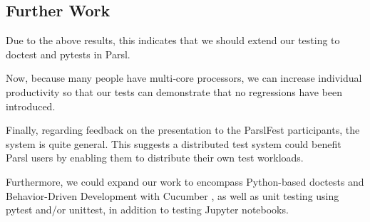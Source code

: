 
\subsection{Further Work}

Due to the above results, this indicates that we should extend our testing to doctest and pytests in Parsl.

Now, because many people have multi‑core processors, we can increase individual productivity so that our tests can demonstrate that no regressions have been introduced.

Finally, regarding feedback on the presentation to the ParslFest participants, the system is quite general. This suggests a distributed test system could benefit Parsl users by enabling them to distribute their own test workloads.

Furthermore, we could expand our work to encompass Python-based doctests and Behavior-Driven Development with Cucumber \cite{cucumber2025}, as well as unit testing using pytest and/or unittest, in addition to testing Jupyter notebooks.







